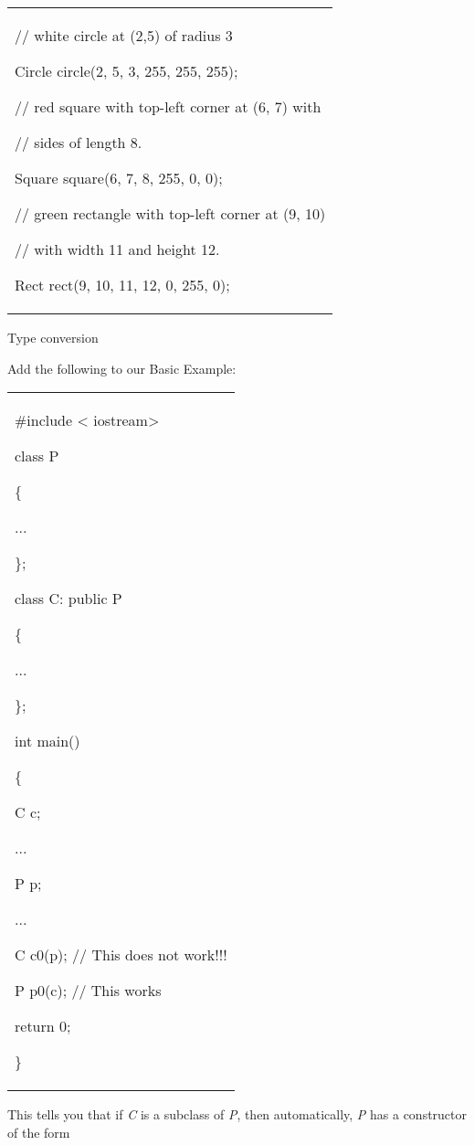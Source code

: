 \documentclass[
]{article}
\begin{document}
\begin{longtable}[]{@{}
  >{\raggedright\arraybackslash}p{}@{}}
\toprule\noalign{}
 \\
\midrule\noalign{}
\endhead
\bottomrule\noalign{}
\endlastfoot
// white circle at (2,5) of radius 3

Circle circle(2, 5, 3, 255, 255, 255);

// red square with top-left corner at (6, 7) with

// sides of length 8.

Square square(6, 7, 8, 255, 0, 0);

// green rectangle with top-left corner at (9, 10)

// with width 11 and height 12.

Rect rect(9, 10, 11, 12, 0, 255, 0); \\
\end{longtable}

Type conversion

Add the following to our Basic Example:

\begin{longtable}[]{@{}
  >{\raggedright\arraybackslash}p{}@{}}
\toprule\noalign{}
 \\
\midrule\noalign{}
\endhead
\bottomrule\noalign{}
\endlastfoot
\#include < iostream\textgreater{}

class P

\{

...

\};

class C: public P

\{

...

\};

int main()

\{

C c;

...

P p;

...

C c0(p); // This does not work!!!

P p0(c); // This works

return 0;

\} \\
\end{longtable}

This tells you that if \emph{C} is a subclass of \emph{P}, then
automatically, \emph{P} has a constructor of the form
\end{document}
